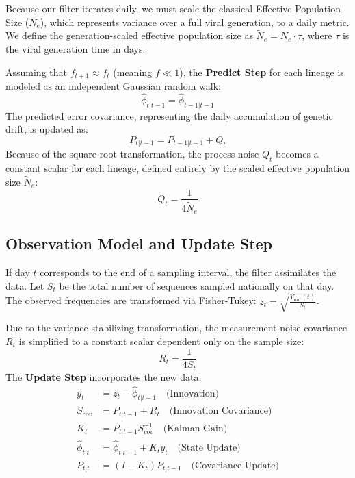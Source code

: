 \documentclass[12pt]{article}
\begin{document}
Because our filter iterates daily, we must scale the classical Effective Population Size ($N_e$), which represents variance over a full viral generation, to a daily metric. We define the generation-scaled effective population size as $\tilde{N}_e = N_e \cdot \tau$, where $\tau$ is the viral generation time in days.

Assuming that $f_{t+1} \approx f_t$ (meaning $f \ll 1$), the \textbf{Predict Step} for each lineage is modeled as an independent Gaussian random walk:
\begin{equation}
    \hat{\phi}_{t|t-1} = \hat{\phi}_{t-1|t-1}
\end{equation}
The predicted error covariance, representing the daily accumulation of genetic drift, is updated as:
\begin{equation}
    P_{t|t-1} = P_{t-1|t-1} + Q_t
\end{equation}
Because of the square-root transformation, the process noise $Q_t$ becomes a constant scalar for each lineage, defined entirely by the scaled effective population size $\tilde{N}_e$:
\begin{equation}
    Q_t = \frac{1}{4 \tilde{N}_e}
\end{equation}

\subsection{Observation Model and Update Step}
If day $t$ corresponds to the end of a sampling interval, the filter assimilates the data. Let $S_t$ be the total number of sequences sampled nationally on that day. The observed frequencies are transformed via Fisher-Tukey: $z_t = \sqrt{\frac{Y_{nat}(t)}{S_t}}$. 

Due to the variance-stabilizing transformation, the measurement noise covariance $R_t$ is simplified to a constant scalar dependent only on the sample size:
\begin{equation}
    R_t = \frac{1}{4 S_t}
\end{equation}
The \textbf{Update Step} incorporates the new data:
\begin{align}
    y_t &= z_t - \hat{\phi}_{t|t-1} \quad \text{(Innovation)} \\
    S_{cov} &= P_{t|t-1} + R_t \quad \text{(Innovation Covariance)} \\
    K_t &= P_{t|t-1} S_{cov}^{-1} \quad \text{(Kalman Gain)} \\
    \hat{\phi}_{t|t} &= \hat{\phi}_{t|t-1} + K_t y_t \quad \text{(State Update)} \\
    P_{t|t} &= (I - K_t) P_{t|t-1} \quad \text{(Covariance Update)}
\end{align}
\end{document}
